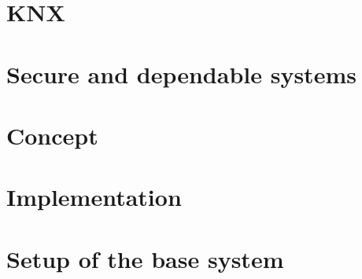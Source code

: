 \documentclass[a4paper,11pt,oneside,openany]{memoir}
\begin{document}


\chapter{KNX}
\label{ch:knx}


%

\chapter{Secure and dependable systems}
\label{ch:SOAcryptography}


\chapter{Concept}
\label{ch:security}


\chapter{Implementation}
\label{ch:implementation}



\appendix

\nocite{*}	%



\chapter{Setup of the base system}
\label{ch:basesystem}


\printglossary

\printbibliography


\end{document}
